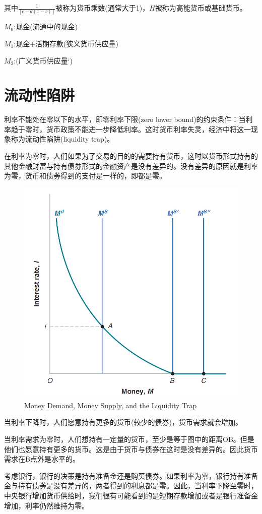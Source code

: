 \documentclass{article}
\begin{document}
其中$ \frac{1}{[c+\theta(1-c)]} $被称为货币乘数(通常大于1)，$ H $被称为高能货币或基础货币。

\hspace*{\fill}

$ M_0 $:现金(流通中的现金)

$ M_1 $:现金+活期存款(狭义货币供应量)

$ M_2 $:(广义货币供应量`)

\section{流动性陷阱}

利率不能处在零以下的水平，即零利率下限(zero lower bound)的约束条件：当利率趋于零时，货币政策不能进一步降低利率。这时货币利率失灵，经济中将这一现象称为流动性陷阱(liquidity trap)。

在利率为零时，人们如果为了交易的目的的需要持有货币，这时以货币形式持有的其他金融财富与持有债券形式的金融资产是没有差异的。没有差异的原因就是利率为零，货币和债券得到的支付是一样的，即都是零。

\begin{figure}[H] %
	\centering %
	\includegraphics[width=1\textwidth]{4_1} %
	\caption{Money Demand, Money
		Supply, and the Liquidity
		Trap} %
	\label{Fig.main2} %
\end{figure}

当利率下降时，人们愿意持有更多的货币(较少的债券)，货币需求就会增加。

当利率需求为零时，人们想持有一定量的货币，至少是等于图中的距离OB。但是他们也愿意持有更多的货币。这是由于货币与债券在这时是没有差异的。因此货币需求在B点外是水平的。

考虑银行，银行的决策是持有准备金还是购买债券。如果利率为零，银行持有准备金与持有债券是没有差异的，两者得到的利息都是零。因此，当利率下降至零时，中央银行增加货币供给时，我们很有可能看到的是短期存款增加或者是银行准备金增加，利率仍然维持为零。
\end{document}
